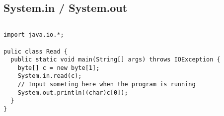 \documentclass[en, 11pt, xcolor=dvipsnames]{beamer}
\begin{document}
\subsection{System.in / System.out}
\begin{frame}[fragile]


	\begin{columns}[c]
		\begin{column}{0.9\textwidth}

			\begin{lstlisting}[style=Java]
import java.io.*;

pulic class Read {
  public static void main(String[] args) throws IOException {
    byte[] c = new byte[1];
    System.in.read(c);
    // Input someting here when the program is running
    System.out.println((char)c[0]);
  }
}\end{lstlisting}

		\end{column}
	\end{columns}

\end{frame}
\end{document}
